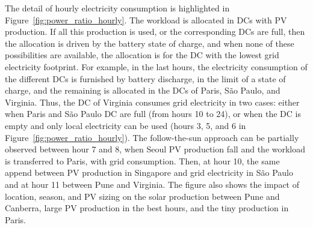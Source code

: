 The detail of hourly electricity consumption is highlighted in Figure~\ref{fig:power_ratio_hourly}. The workload is allocated in DCs with PV production. If all this production is used, or the corresponding DCs are full, then the allocation is driven by the battery state of charge, and when none of these possibilities are available, the allocation is for the DC with the lowest grid electricity footprint. For example, in the last hours, the electricity consumption of the different DCs is furnished by battery discharge, in the limit of a state of charge, and the remaining is allocated in the DCs of Paris, S\~ao Paulo, and Virginia. Thus, the DC of Virginia consumes grid electricity in two cases: either when Paris and S\~ao Paulo DC are full (from hours 10 to 24), or when the DC is empty and only local electricity can be used (hours 3, 5, and 6 in Figure~\ref{fig:power_ratio_hourly}). The follow-the-sun approach can be partially observed between hour 7 and 8, when Seoul PV production fall and the workload is transferred to Paris, with grid consumption.  Then, at hour 10, the same append between PV production in Singapore and grid electricity in S\~ao Paulo and at hour 11 between Pune and Virginia. The figure also shows the impact of location, season, and PV sizing on the solar production between Pune and Canberra, large PV production in the best hours, and the tiny production in Paris.

